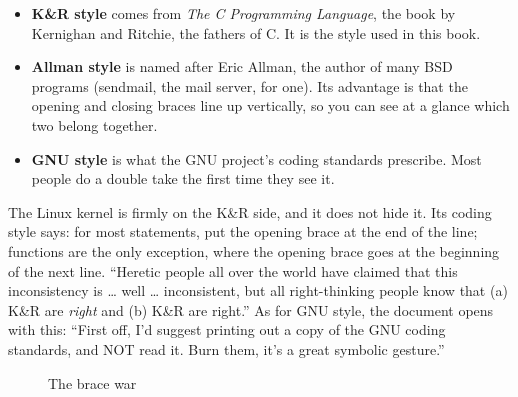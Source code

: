 \begin{itemize}
  \item \textbf{K\&R style} comes from \emph{The C Programming Language}, the book by Kernighan and Ritchie, the fathers of C. It is the style used in this book.
  \item \textbf{Allman style} is named after Eric Allman, the author of many BSD programs (sendmail, the mail server, for one). Its advantage is that the opening and closing braces line up vertically, so you can see at a glance which two belong together.
  \item \textbf{GNU style} is what the GNU project's coding standards prescribe. Most people do a double take the first time they see it.
\end{itemize}

The Linux kernel is firmly on the K\&R side, and it does not hide it. Its coding style says: for most statements, put the opening brace at the end of the line; functions are the only exception, where the opening brace goes at the beginning of the next line. ``Heretic people all over the world have claimed that this inconsistency is \ldots{} well \ldots{} inconsistent, but all right-thinking people know that (a) K\&R are \emph{right} and (b) K\&R are right.'' As for GNU style, the document opens with this: ``First off, I'd suggest printing out a copy of the GNU coding standards, and NOT read it. Burn them, it's a great symbolic gesture.''

\begin{figure}[htbp]
  \centering
  \caption{The brace war}
  \label{fig:braces}
\end{figure}

